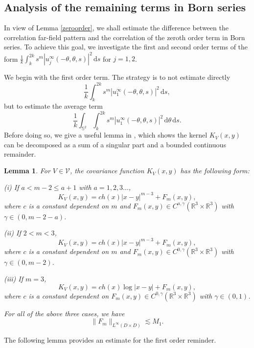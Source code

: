\documentclass[reqno, 12pt]{amsart}
\newtheorem{Le}{Lemma}[section]
\numberwithin{equation}{section}
\begin{document}
\subsection{Analysis of the remaining terms in Born series}
In view of Lemma \ref{zeroorder}, we shall estimate the difference between the correlation far-field pattern and the correlation of the zeroth order term in Born series. To achieve this goal, we investigate the first and second order terms of the form $\frac{1}{k}\int_k^{2k} s^{m} |u_j^\infty(-\theta,\theta,s)|^2\,\mathrm{d}s$ for $j=1, 2$.

We begin with the first order term.
The strategy is to not estimate directly $$\frac{1}{k}\int_k^{2k} s^{m} |u_1^\infty(-\theta,\theta,s)|^2\,\mathrm{d}s,$$ but to estimate the average term 
 $$\frac{1}{k}\int_{\mathbb S^2}\int_k^{2k} s^{m} |u_1^\infty(-\theta,\theta,s)|^2\,\mathrm{d}\theta\,\mathrm{d}s.$$ Before doing so, we give a useful lemma in \cite{wang2024stability}, which shows the kernel $K_V(x,y)$ can be decomposed as a sum of a singular part and a bounded continuous remainder. 
 \begin{Le}\label{Lem2.2}
For $V \in \mathcal V$, the covariance function $K_V(x,y)$ has the following form:
	
	(i)  If $a<m-2\le a+1$ with $a=1,2,3...$,  \[
	K_V(x, y)= ch(x)|x-y|^{m-3} +F_m(x,y),
	\] where $c$ is a constant dependent on $m$ and $F_m(x,y) \in C^{a,\gamma}(\mathbb{R}^3 \times \mathbb{R}^3)$ with $\gamma \in (0, m-2-a)$.
	
	(ii)
	If $2<m< 3$,  \[
	K_V(x, y)= ch(x)|x-y|^{m-3} +F_m(x,y),
	\] where $c$ is a constant dependent on $m$ and $F_m(x,y) \in C^{0,\gamma}(\mathbb{R}^3 \times \mathbb{R}^3)$ with $\gamma \in (0, m-2)$. 
	
	(iii)
	If $m=3$,  \[
	K_V(x, y)= ch(x)\log{|x-y|} +F_m(x,y),
	\] where $c$ is a constant dependent on $F_m(x,y) \in C^{0,\gamma}(\mathbb{R}^3 \times \mathbb{R}^3)$ with $\gamma \in (0, 1)$. 
	
	For all of the above three cases, we have \[
	\|F_m\|_{L^\infty(D \times D)} \lesssim M_1. 
	\]
\end{Le}
The following lemma provides an estimate for the first order reminder.
\end{document}
